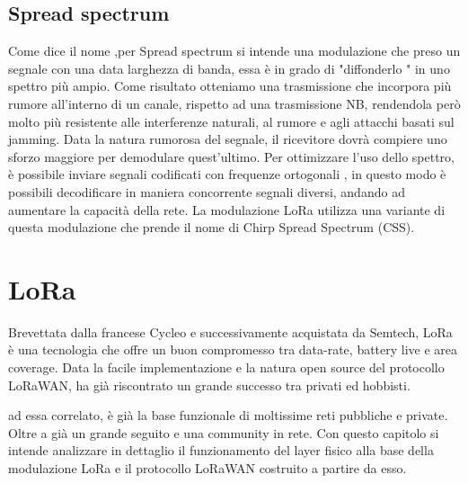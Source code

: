 \subsection{Spread spectrum} 
Come dice il nome ,per  Spread spectrum si intende una modulazione che preso un 
segnale con una data larghezza di banda, essa è in grado di  "diffonderlo " in uno
spettro più ampio.
Come risultato otteniamo una trasmissione che incorpora più rumore all'interno
di un canale, rispetto ad una trasmissione NB, 
rendendola però molto più resistente alle interferenze
naturali, al rumore e agli attacchi basati sul jamming.
Data la natura rumorosa del segnale, il ricevitore dovrà compiere uno sforzo
maggiore per demodulare quest'ultimo.
Per ottimizzare l'uso dello spettro, è possibile inviare segnali codificati con 
frequenze ortogonali , in questo modo è possibili decodificare in maniera
concorrente segnali diversi, andando ad aumentare la capacità della rete.
La modulazione LoRa utilizza una variante di questa modulazione che prende il
nome di Chirp Spread Spectrum (CSS).

\section{LoRa}
Brevettata dalla francese Cycleo e successivamente acquistata da Semtech, LoRa è
una tecnologia che offre un buon compromesso tra data-rate,
battery live e area coverage.
Data la facile implementazione e la natura open source del protocollo LoRaWAN,
ha già riscontrato un grande successo tra privati ed hobbisti.

ad
essa correlato, è già la base funzionale di moltissime reti pubbliche e private.
Oltre a già un grande seguito e una community in rete. Con questo capitolo si intende
analizzare in dettaglio il funzionamento del layer fisico alla base della
modulazione LoRa e il protocollo LoRaWAN costruito a partire da esso.
